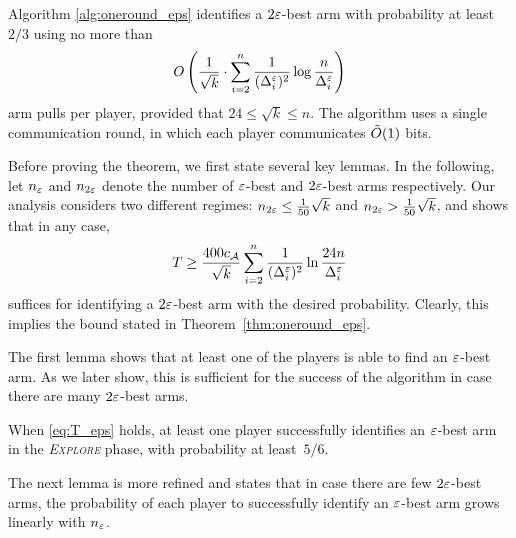 \documentclass{article} %
\newcommand{\cA}{c_\mathcal{A}}
\begin{document}
\begin{theorem} \label{thm:oneround_eps}
Algorithm \ref{alg:oneround_eps} identifies a $2\varepsilon$-best arm with probability at least $2/3$ using no more than
\begin{align*}%
	\OO {
		\frac{1}{\sqrt{k}} \cdot
		\sum_{i=2}^{n} \frac{1}{(\Del_i^\eps)^2} \log \frac{n}{\Del_i^\eps}
	}
\end{align*}
arm pulls per player, provided that $24 \le \sqrt{k} \le n$.
The algorithm uses a single communication round, in which each player communicates $\tilde{O}(1)$ bits.
\end{theorem}





Before proving the theorem, we first state several key lemmas. In the following,
let $n_\varepsilon$ and $n_{2\varepsilon}$ denote the number of $\varepsilon$-best and $2\varepsilon$-best arms respectively.
Our analysis considers two different regimes: $n_{2\varepsilon} \le \tfrac{1}{50}\sqrt{k}$ and $n_{2\varepsilon} > \tfrac{1}{50}\sqrt{k}$, and shows that in any case,
\begin{align} \label{eq:T_eps}
	T \ge
	\frac{400 \cA}{\sqrt{k}} 
		\sum_{i=2}^{n} \frac{1}{(\Del_i^{\eps})^2}\ln \frac{24n}{\Del_i^{\eps}}
\end{align}
suffices for identifying a $2\varepsilon$-best arm with the desired probability.
Clearly, this implies the bound stated in Theorem~\ref{thm:oneround_eps}.

The first lemma shows that at least one of the players is able to find an $\varepsilon$-best arm. As we later show, this is sufficient for the success of the algorithm in case there are many $2\varepsilon$-best arms.



\begin{lemma} \label{lem:kexplore_eps2}
When \eqref{eq:T_eps} holds, at least one player successfully identifies an $\varepsilon$-best arm in the \emph{\textsc{Explore}} phase, with probability at least~$5/6$.
\end{lemma}


The next lemma is more refined and states that in case there are few $2\varepsilon$-best arms, the probability of each player to successfully identify an $\varepsilon$-best arm grows linearly with $n_\varepsilon$.
\end{document}

